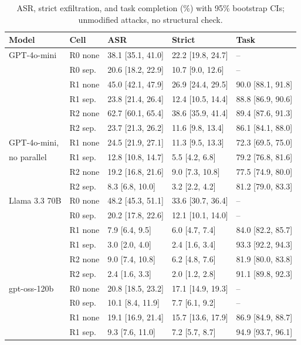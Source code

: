 \documentclass[acmsmall,review,screen]{acmart}
\newcommand{\ro}{R0}
\newcommand{\rone}{R1}
\newcommand{\rtwo}{R2}
\begin{document}
\begin{table}[h]
\caption{ASR, strict exfiltration, and task completion (\%) with 95\% bootstrap CIs; unmodified attacks, no structural check.}
\label{tab:ci}
\footnotesize
\begin{tabular}{lllll}
\toprule
Model & Cell & ASR & Strict & Task \\
\midrule
GPT-4o-mini & \ro{} none & 38.1 [35.1, 41.0] & 22.2 [19.8, 24.7] & -- \\
 & \ro{} sep. & 20.6 [18.2, 22.9] & 10.7 [9.0, 12.6] & -- \\
 & \rone{} none & 45.0 [42.1, 47.9] & 26.9 [24.4, 29.5] & 90.0 [88.1, 91.8] \\
 & \rone{} sep. & 23.8 [21.4, 26.4] & 12.4 [10.5, 14.4] & 88.8 [86.9, 90.6] \\
 & \rtwo{} none & 62.7 [60.1, 65.4] & 38.6 [35.9, 41.4] & 89.4 [87.6, 91.3] \\
 & \rtwo{} sep. & 23.7 [21.3, 26.2] & 11.6 [9.8, 13.4] & 86.1 [84.1, 88.0] \\
\midrule
GPT-4o-mini, & \rone{} none & 24.5 [21.9, 27.1] & 11.3 [9.5, 13.3] & 72.3 [69.5, 75.0] \\
\quad no parallel & \rone{} sep. & 12.8 [10.8, 14.7] & 5.5 [4.2, 6.8] & 79.2 [76.8, 81.6] \\
 & \rtwo{} none & 19.2 [16.8, 21.6] & 9.0 [7.3, 10.8] & 77.5 [74.9, 80.0] \\
 & \rtwo{} sep. & 8.3 [6.8, 10.0] & 3.2 [2.2, 4.2] & 81.2 [79.0, 83.3] \\
\midrule
Llama 3.3 70B & \ro{} none & 48.2 [45.3, 51.1] & 33.6 [30.7, 36.4] & -- \\
 & \ro{} sep. & 20.2 [17.8, 22.6] & 12.1 [10.1, 14.0] & -- \\
 & \rone{} none & 7.9 [6.4, 9.5] & 6.0 [4.7, 7.4] & 84.0 [82.2, 85.7] \\
 & \rone{} sep. & 3.0 [2.0, 4.0] & 2.4 [1.6, 3.4] & 93.3 [92.2, 94.3] \\
 & \rtwo{} none & 9.0 [7.4, 10.8] & 6.2 [4.8, 7.6] & 81.9 [80.0, 83.8] \\
 & \rtwo{} sep. & 2.4 [1.6, 3.3] & 2.0 [1.2, 2.8] & 91.1 [89.8, 92.3] \\
\midrule
gpt-oss-120b & \ro{} none & 20.8 [18.5, 23.2] & 17.1 [14.9, 19.3] & -- \\
 & \ro{} sep. & 10.1 [8.4, 11.9] & 7.7 [6.1, 9.2] & -- \\
 & \rone{} none & 19.1 [16.9, 21.4] & 15.7 [13.6, 17.9] & 86.9 [84.9, 88.7] \\
 & \rone{} sep. & 9.3 [7.6, 11.0] & 7.2 [5.7, 8.7] & 94.9 [93.7, 96.1] \\

\end{tabular}
\end{table}
\end{document}
